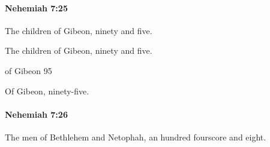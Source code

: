 		\paragraph{Nehemiah 7:25} %
			\label{NEHEMIAH-7-25}

			The children of Gibeon, ninety and five.

			\begin{versebox}
					\item[BHS] 
					\item[LXX] 
					\item[ASV] The children of Gibeon, ninety and five.
					\item[NIV] of Gibeon 95
					\item[NRSV] Of Gibeon, ninety-five.
			\end{versebox}

		\paragraph{Nehemiah 7:26} %
			\label{NEHEMIAH-7-26}

			The men of Bethlehem and Netophah, an hundred fourscore and eight.

